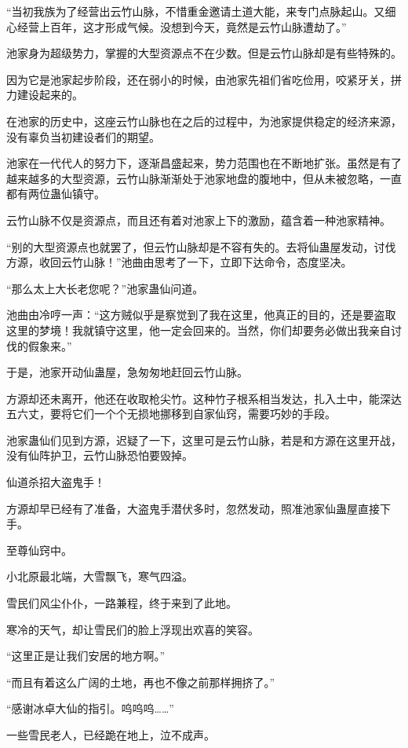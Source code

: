 \begin{this_body}
“当初我族为了经营出云竹山脉，不惜重金邀请土道大能，来专门点脉起山。又细心经营上百年，这才形成气候。没想到今天，竟然是云竹山脉遭劫了。”

池家身为超级势力，掌握的大型资源点不在少数。但是云竹山脉却是有些特殊的。

因为它是池家起步阶段，还在弱小的时候，由池家先祖们省吃俭用，咬紧牙关，拼力建设起来的。

在池家的历史中，这座云竹山脉也在之后的过程中，为池家提供稳定的经济来源，没有辜负当初建设者们的期望。

池家在一代代人的努力下，逐渐昌盛起来，势力范围也在不断地扩张。虽然是有了越来越多的大型资源，云竹山脉渐渐处于池家地盘的腹地中，但从未被忽略，一直都有两位蛊仙镇守。

云竹山脉不仅是资源点，而且还有着对池家上下的激励，蕴含着一种池家精神。

“别的大型资源点也就罢了，但云竹山脉却是不容有失的。去将仙蛊屋发动，讨伐方源，收回云竹山脉！”池曲由思考了一下，立即下达命令，态度坚决。

“那么太上大长老您呢？”池家蛊仙问道。

池曲由冷哼一声：“这方贼似乎是察觉到了我在这里，他真正的目的，还是要盗取这里的梦境！我就镇守这里，他一定会回来的。当然，你们却要务必做出我亲自讨伐的假象来。”

于是，池家开动仙蛊屋，急匆匆地赶回云竹山脉。

方源却还未离开，他还在收取枪尖竹。这种竹子根系相当发达，扎入土中，能深达五六丈，要将它们一个个无损地挪移到自家仙窍，需要巧妙的手段。

池家蛊仙们见到方源，迟疑了一下，这里可是云竹山脉，若是和方源在这里开战，没有仙阵护卫，云竹山脉恐怕要毁掉。

仙道杀招大盗鬼手！

方源却早已经有了准备，大盗鬼手潜伏多时，忽然发动，照准池家仙蛊屋直接下手。

至尊仙窍中。

小北原最北端，大雪飘飞，寒气四溢。

雪民们风尘仆仆，一路兼程，终于来到了此地。

寒冷的天气，却让雪民们的脸上浮现出欢喜的笑容。

“这里正是让我们安居的地方啊。”

“而且有着这么广阔的土地，再也不像之前那样拥挤了。”

“感谢冰卓大仙的指引。呜呜呜……”

一些雪民老人，已经跪在地上，泣不成声。


\end{this_body}
